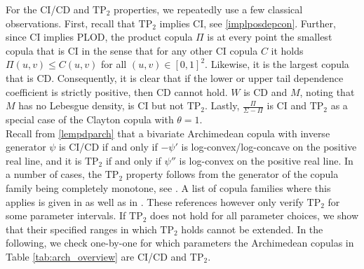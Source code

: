 \documentclass{article}
\newcommand{\TP}{\mathrm{TP_2}}
\begin{document}
For the CI/CD and $\TP$ properties, we repeatedly use a few classical observations.
First, recall that $\TP$ implies CI, see \eqref{implposdepcon}.
Further, since CI implies PLOD, the product copula $\Pi$ is at every point the smallest copula that is CI in the sense that for any other CI copula $C$ it holds $\Pi(u,v)\leq C(u,v)$ for all $(u,v)\in[0,1]^2$.
Likewise, it is the largest copula that is CD.
Consequently, it is clear that if the lower or upper tail dependence coefficient is strictly positive, then CD cannot hold.
$W$ is CD and $M$, noting that $M$ has no Lebesgue density, is CI but not $\TP$.
Lastly, $\frac{\Pi}{\Sigma - \Pi}$ is CI and $\TP$ as a special case of the Clayton copula with $\theta = 1$. \\
Recall from \eqref{lempdparch} that a bivariate Archimedean copula with inverse generator $\psi$ is CI/CD if and only if $-\psi'$ is log-convex/log-concave on the positive real line, and it is $\TP$ if and only if $\psi''$ is log-convex on the positive real line.
In a number of cases, the $\TP$ property follows from the generator of the copula family being completely monotone, see \cite[Theorem 2.14]{Mueller-2005}.
A list of copula families where this applies is given in \cite[Table 2]{hofert2008sampling} as well as in \cite[Exercise 4.24]{Nelsen-2006}.
These references however only verify $\TP$ for some parameter intervals.
If $\TP$ does not hold for all parameter choices, we show that their specified ranges in which $\TP$ holds cannot be extended.
In the following, we check one-by-one for which parameters the Archimedean copulas in Table \ref{tab:arch_overview} are CI/CD and $\TP$.
\end{document}
